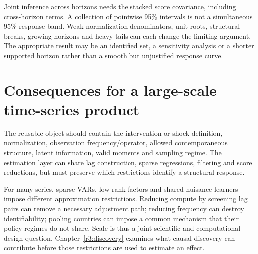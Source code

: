 Joint inference across horizons needs the stacked score covariance,
including cross-horizon terms. A collection of pointwise 95\% intervals
is not a simultaneous 95\% response band. Weak normalization denominators,
unit roots, structural breaks, growing horizons and heavy tails can
each change the limiting argument. The appropriate result may be an
identified set, a sensitivity analysis or a shorter supported horizon
rather than a smooth but unjustified response curve.



\section{Consequences for a large-scale time-series product}
The reusable object should contain the intervention or shock definition,
normalization, observation frequency/operator, allowed contemporaneous
structure, latent information, valid moments and sampling regime.
The estimation layer can share lag construction, sparse regressions,
filtering and score reductions, but must preserve which restrictions
identify a structural response.

For many series, sparse VARs, low-rank factors and shared nuisance
learners impose different approximation restrictions. Reducing compute
by screening lag pairs can remove a necessary adjustment path; reducing
frequency can destroy identifiability; pooling countries can impose a
common mechanism that their policy regimes do not share. Scale is thus
a joint scientific and computational design question. Chapter~\ref{r3:discovery} examines what causal discovery can contribute
before those restrictions are used to estimate an effect.





